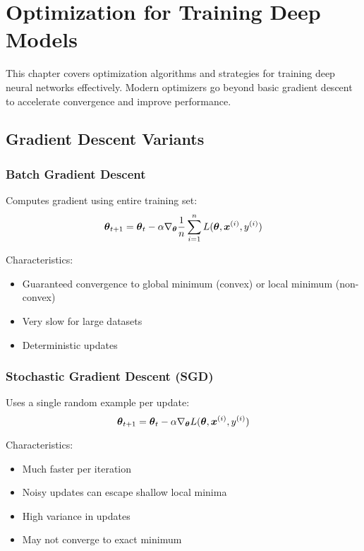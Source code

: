
\chapter{Optimization for Training Deep Models}
\label{chap:optimization}

This chapter covers optimization algorithms and strategies for training deep neural networks effectively. Modern optimizers go beyond basic gradient descent to accelerate convergence and improve performance.

\section{Gradient Descent Variants}
\label{sec:gd-variants}

\subsection{Batch Gradient Descent}

Computes gradient using entire training set:
\begin{equation}
\boldsymbol{\theta}_{t+1} = \boldsymbol{\theta}_t - \alpha \nabla_{\boldsymbol{\theta}} \frac{1}{n} \sum_{i=1}^{n} L(\boldsymbol{\theta}, \boldsymbol{x}^{(i)}, y^{(i)})
\end{equation}

Characteristics:
\begin{itemize}
    \item Guaranteed convergence to global minimum (convex) or local minimum (non-convex)
    \item Very slow for large datasets
    \item Deterministic updates
\end{itemize}

\subsection{Stochastic Gradient Descent (SGD)}

Uses a single random example per update:
\begin{equation}
\boldsymbol{\theta}_{t+1} = \boldsymbol{\theta}_t - \alpha \nabla_{\boldsymbol{\theta}} L(\boldsymbol{\theta}, \boldsymbol{x}^{(i)}, y^{(i)})
\end{equation}

Characteristics:
\begin{itemize}
    \item Much faster per iteration
    \item Noisy updates can escape shallow local minima
    \item High variance in updates
    \item May not converge to exact minimum
\end{itemize}


